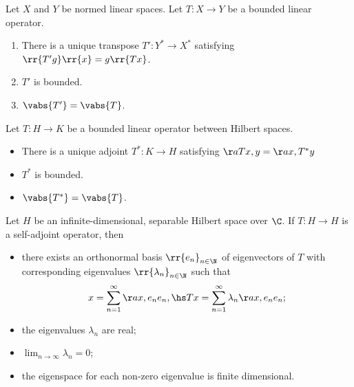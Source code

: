 \documentclass{article}
\begin{document}
\begin{theorem}
  Let $X$ and $Y$ be normed  linear spaces. Let $T:X\to Y$ be a bounded linear operator.
  \begin{enumerate}
    \item There is a unique transpose $T':Y^*\to X^*$ satisfying
      $\rr{T'g}\rr{x}=g\rr{Tx}$.
    \item $T'$ is bounded.
    \item $\vabs{T'}=\vabs{T}$.
  \end{enumerate}
\end{theorem}

\begin{theorem}
  Let $T:H\to K$ be a bounded linear operator between Hilbert spaces.
  \begin{itemize}
    \item There is a unique adjoint $T^*:K\to H$ satisfying
      $\aa{Tx,y} = \aa{x,T^*y}$
    \item $T^*$ is bounded.
    \item $\vabs{T^*}=\vabs{T}$.
  \end{itemize}
\end{theorem}

\begin{theorem}
  Let $H$ be an infinite-dimensional, separable Hilbert space over $\C$.
  If $T:H\to H$ is a self-adjoint operator, then
  \begin{itemize}
    \item there exists an orthonormal basis $\rr{e_n}_{n\in\N}$ of eigenvectors
      of $T$ with corresponding eigenvalues $\rr{\lambda_n}_{n\in\N}$ such that
      \begin{align*}
        x = \sum_{n=1}^{\infty} \aa{x,e_n}e_n,\hs
        Tx = \sum_{n=1}^{\infty} \lambda_n\aa{x,e_n}e_n;
      \end{align*}
    \item the eigenvalues $\lambda_n$ are real;
    \item $\lim_{n\to\infty} \lambda_n=0$;
    \item the eigenspace for each non-zero eigenvalue is finite dimensional.
  \end{itemize}
\end{theorem}
\end{document}
